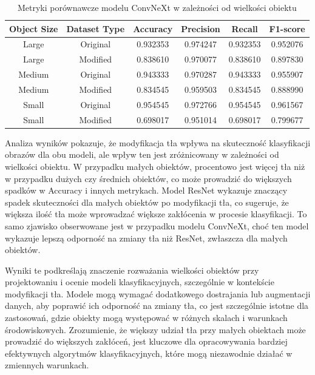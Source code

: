 \begin{table}
	\centering
	\begin{tabular}{|c|c|c|c|c|c|}
		\hline
		\textbf{Object Size} & \textbf{Dataset Type} & \textbf{Accuracy} & \textbf{Precision} & \textbf{Recall} & \textbf{F1-score} \\
		\hline
		Large & Original & 0.932353 & 0.974247 & 0.932353 & 0.952076 \\
		\hline
		Large & Modified & 0.838610 & 0.970077 & 0.838610 & 0.897830 \\
		\hline
		Medium & Original & 0.943333 & 0.970287 & 0.943333 & 0.955907 \\
		\hline
		Medium & Modified & 0.834545 & 0.959503 & 0.834545 & 0.888990 \\
		\hline
		Small & Original & 0.954545 & 0.972766 & 0.954545 & 0.961567 \\
		\hline
		Small & Modified & 0.698017 & 0.951014 & 0.698017 & 0.799677 \\
		\hline
	\end{tabular}
	\caption{Metryki porównawcze modelu ConvNeXt w zależności od wielkości obiektu}
	\label{tab:convnext_object_size_metrics}
\end{table}

Analiza wyników pokazuje, że modyfikacja tła wpływa na skuteczność klasyfikacji obrazów dla obu modeli, ale wpływ ten jest zróżnicowany w 
zależności od wielkości obiektu. W przypadku małych obiektów, procentowo jest więcej tła niż w przypadku dużych czy średnich obiektów, co może 
prowadzić do większych spadków w Accuracy i innych metrykach. Model ResNet wykazuje znaczący spadek skuteczności dla małych obiektów po 
modyfikacji tła, co sugeruje, że większa ilość tła może wprowadzać większe zakłócenia w procesie klasyfikacji. To samo zjawisko obserwowane 
jest w przypadku modelu ConvNeXt, choć ten model wykazuje lepszą odporność na zmiany tła niż ResNet, zwłaszcza dla małych obiektów.

Wyniki te podkreślają znaczenie rozważania wielkości obiektów przy projektowaniu i ocenie modeli klasyfikacyjnych, szczególnie w kontekście 
modyfikacji tła. Modele mogą wymagać dodatkowego dostrajania lub augmentacji danych, aby poprawić ich odporność na zmiany tła, co jest 
szczególnie istotne dla zastosowań, gdzie obiekty mogą występować w różnych skalach i warunkach środowiskowych. Zrozumienie, że większy udział 
tła przy małych obiektach może prowadzić do większych zakłóceń, jest kluczowe dla opracowywania bardziej efektywnych algorytmów klasyfikacyjnych, 
które mogą niezawodnie działać w zmiennych warunkach.

